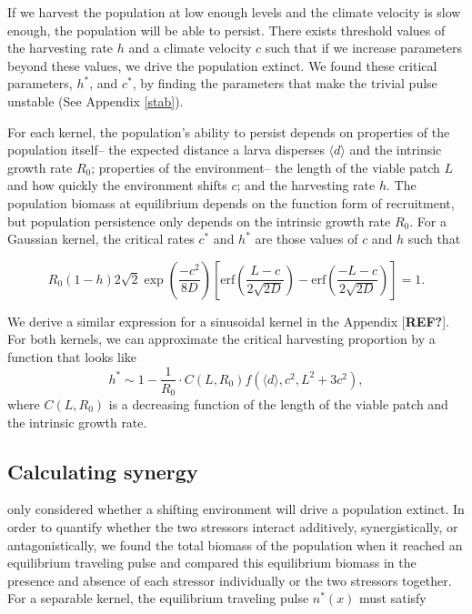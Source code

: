 \documentclass[12pt,english]{article}
\begin{document}
\begin{spacing}{1.9}
\begin{flushleft}
If we harvest the population at low enough levels and the climate velocity is slow enough, the population will be able to persist.  There exists threshold values of the harvesting rate $h$ and a climate velocity $c$ such that if we increase parameters beyond these values, we drive the population extinct.  We found these critical parameters, $h^*$, and  $c^*$, by finding the parameters that make the trivial pulse unstable (See Appendix \ref{stab}).

For each kernel, the population's ability to persist depends on properties of the population itself-- the expected distance a larva disperses $\langle d \rangle$ and the intrinsic growth rate $R_0$; properties of the environment-- the length of the viable patch $L$ and how quickly the environment shifts $c$; and the harvesting rate $h$.  The population biomass at equilibrium depends on the function form of recruitment, but population persistence only depends on the intrinsic growth rate $R_0$.  For a Gaussian kernel, the critical rates $c^*$ and $h^*$ are those values of $c$ and $h$ such that 

\[R_0(1-h)2\sqrt{2}\exp\left(\frac{-c^2}{8D}\right)\left[\text{erf}\left(\frac{L-c}{2\sqrt{2D}}\right)-\text{erf}\left(\frac{-L-c}{2\sqrt{2D}}\right)\right]=1.\]

We derive a similar expression for a sinusoidal kernel in the Appendix [{\bf REF?}].  For both kernels, we can approximate the critical harvesting proportion by a function that looks like 
\begin{equation*}
h^*\sim1- \frac{1}{R_0}\cdot C(L,R_0)f(\langle d \rangle,c^2,L^2+3c^2),
\end{equation*}
where $C(L,R_0)$ is a decreasing function of the length of the viable patch and the intrinsic growth rate.
   

\subsection{Calculating synergy }

\citet{ZhouKot2011} only considered whether a shifting environment will drive a population extinct.   In order to quantify whether the two stressors interact additively, synergistically, or antagonistically, we found the total biomass of the population when it reached an equilibrium traveling pulse and compared this equilibrium biomass in the presence and absence of each stressor individually or the two stressors together.  For a separable kernel, the equilibrium traveling pulse $n^*(x)$ must satisfy 


\end{flushleft}
\end{spacing}
\end{document}
